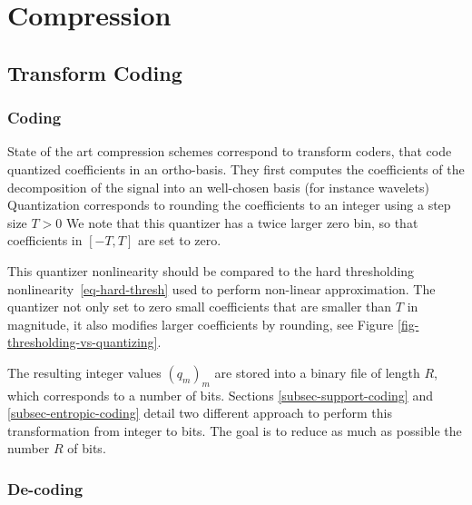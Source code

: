 
\chapter{Compression}

\section{Transform Coding}
\label{sec-transform-coding}

\subsection{Coding}

State of the art compression schemes correspond to transform coders, that code quantized coefficients in an ortho-basis. They first computes the coefficients of the decomposition of the signal into an well-chosen basis (for instance wavelets)
Quantization corresponds to rounding the coefficients to an integer using a step size $T>0$
We note that this quantizer has a twice larger zero bin, so that coefficients in $[-T,T]$ are set to zero.

This quantizer nonlinearity should be compared to the hard thresholding nonlinearity~\eqref{eq-hard-thresh} used to perform non-linear approximation. The quantizer not only set to zero small coefficients that are smaller than $T$ in magnitude, it also modifies larger coefficients by rounding, see Figure \ref{fig-thresholding-vs-quantizing}. 


The resulting integer values $(q_m)_m$ are stored into a binary file of length $R$, which corresponds to a number of bits. 
Sections \ref{subsec-support-coding} and \ref{subsec-entropic-coding} detail two different approach to perform this transformation from integer to bits. The goal is to reduce as much as possible the number $R$ of bits. 

\subsection{De-coding}


